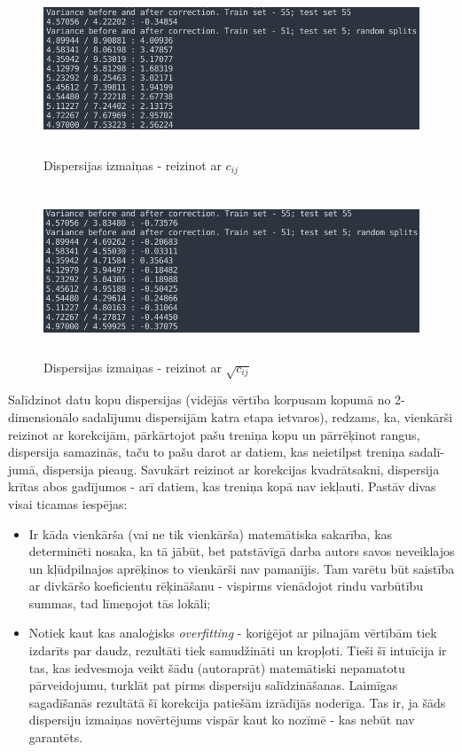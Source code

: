 \documentclass[12pt, a4paper]{article}
\begin{document}
\begin{figure}[h!]
    \centering
    \includegraphics[height=5cm]{output-variance-bad.png}
    \caption{Dispersijas izmaiņas - reizinot ar $c_{ij}$}
\end{figure}
\newpage
\begin{figure}[h!]
    \centering
    \includegraphics[height=5cm,page=1]{output-variance.png}
    \caption{Dispersijas izmaiņas - reizinot ar $\sqrt{c_{ij}}$}
\end{figure}

Salīdzinot datu kopu dispersijas (vidējās vērtība korpusam kopumā no 2-dimensionālo sadalījumu dispersijām katra etapa ietvaros), redzams, ka, vienkārši reizinot ar korekcijām, pārkārtojot pašu treniņa kopu un pārrēķinot rangus, dispersija samazinās, taču to pašu darot ar datiem, kas neietilpst treniņa sadalī-jumā, dispersija pieaug. Savukārt reizinot ar korekcijas kvadrātsakni, dispersija krītas abos gadījumos - arī datiem, kas treniņa kopā nav iekļauti. Pastāv divas visai ticamas iespējas:

\begin{itemize}
    \item Ir kāda vienkārša (vai ne tik vienkārša) matemātiska sakarība, kas determinēti nosaka, ka tā jābūt, bet patstāvīgā darba autors savos neveiklajos un kļūdpilnajos aprēķinos to vienkārši nav pamanījis. Tam varētu būt saistība ar divkāršo koeficientu rēķināšanu - vispirms vienādojot rindu varbūtību summas, tad līmeņojot tās lokāli;
    \item Notiek kaut kas analoģisks \textit{overfitting} - koriģējot ar pilnajām vērtībām tiek izdarīts par daudz, rezultāti tiek samudžināti un kropļoti. Tieši šī intuīcija ir tas, kas iedvesmoja veikt šādu (autoraprāt) matemātiski nepamatotu pārveidojumu, turklāt pat pirms dispersiju salīdzināšanas. Laimīgas sagadīšanās rezultātā šī korekcija patiešām izrādījās noderīga. Tas ir, ja šāds dispersiju izmaiņas novērtējums vispār kaut ko nozīmē - kas nebūt nav garantēts.
\end{itemize}
\end{document}

